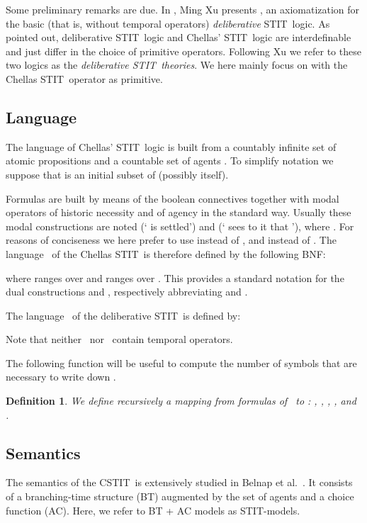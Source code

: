 \documentclass{article}
\newtheorem{definition}{Definition}
\newcommand{\STIT} {{\textsf{STIT}}}              \newcommand{\CSTIT}{{\textsf{CSTIT}}}            \newcommand{\DSTIT}{{\textsf{DSTIT}}}
\newcommand{\LCSTIT}{}
\newcommand{\LDSTIT}{}
\begin{document}
Some preliminary remarks are due. In \cite[Chap.\ 17]{belnap01facing},
Ming Xu presents , an axiomatization for the basic
(that is, without temporal operators) \emph{deliberative} \STIT\ logic.
As pointed out, deliberative \STIT\ logic and Chellas' \STIT\ logic are
interdefinable and just differ in the choice of primitive operators.
Following Xu we refer to these two logics as the
\emph{deliberative \STIT\ theories}.
We here mainly focus on  with the Chellas \STIT\ operator as
primitive.

\subsection{Language}
The language of Chellas' \STIT\ logic is built from
a countably infinite set of atomic propositions  and
a countable set of agents .
To simplify notation we suppose that  is an initial subset
 of  (possibly  itself).

Formulas are built by means of the boolean connectives together
with modal operators of historic necessity and of agency in the standard way.
Usually these modal constructions are noted
 (` is settled') and
 (` sees to it that '),
where
. For reasons of conciseness we here prefer to use
 instead of ,
and 
instead of .
The language \LCSTIT\ of the Chellas \STIT\ is therefore defined by the following BNF:

where  ranges over  and  ranges over .
This provides a standard notation for the dual constructions
 and , respectively abbreviating
 and .

The language \LDSTIT\ of the deliberative \STIT\ is defined by:

Note that neither \LCSTIT\ nor \LDSTIT\ contain temporal operators.

The following function will be useful to compute
the number of symbols that are necessary to write down .

\begin{definition}
We define recursively a mapping  from formulas of \LCSTIT  \LDSTIT\
to  :
,
,
,
, and
.
\end{definition}


\goodbreak
\subsection{Semantics}
The semantics of the \CSTIT\ is extensively studied in Belnap et al.\ \cite{belnap01facing}.
It consists of a branching-time structure (BT)
augmented by the set of agents and a choice function (AC).
Here, we refer to BT + AC models as \STIT-models.
\end{document}
